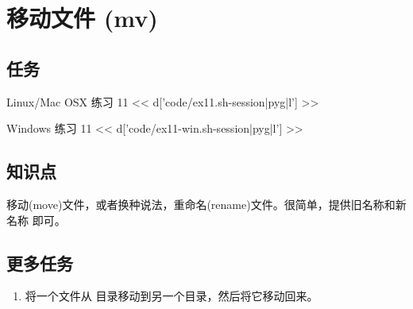 \chapter{移动文件 (mv)}

\section{任务}

\begin{code}{Linux/Mac OSX 练习 11}
<< d['code/ex11.sh-session|pyg|l'] >>
\end{code}

\begin{code}{Windows 练习 11}
<< d['code/ex11-win.sh-session|pyg|l'] >>
\end{code}

\section{知识点}

移动(move)文件，或者换种说法，重命名(rename)文件。很简单，提供旧名称和新名称
即可。

\section{更多任务}

\begin{enumerate}
\item 将一个文件从  目录移动到另一个目录，然后将它移动回来。
\end{enumerate}

